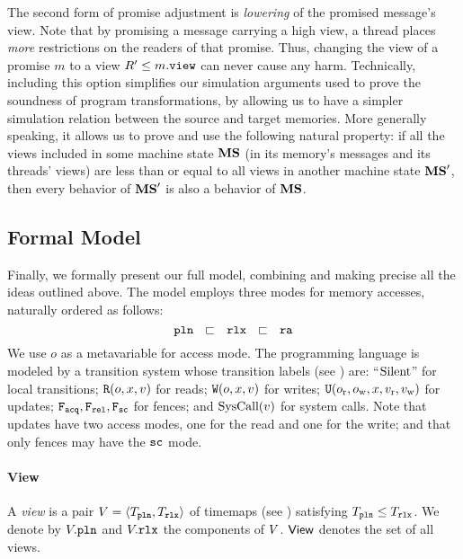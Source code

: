 The second form of promise adjustment is \emph{lowering} of the promised message's view.
Note that by promising a message carrying a high view, a thread places \emph{more} restrictions on the readers of that promise.
Thus, changing the view of a promise $m$ to a view $R'\leq m.\texttt{view}$ can never cause any harm.
Technically, including this option simplifies our simulation arguments used to prove the soundness of program transformations,
by allowing us to have a simpler simulation relation between the source and target memories.
More generally speaking, it allows us to prove and use the following natural property:
if all the views included in some machine state ${\mathbf{MS}}$ (in its memory's messages and its threads' views)
are less than or equal to all views in another machine state ${\mathbf{MS}}'$, 
then every behavior of ${\mathbf{MS}}'$ is also a behavior of ${\mathbf{MS}}$.

\subsection{Formal Model}
\label{sec:full-formal}

Finally, we formally present our full model,
combining and making precise all the ideas outlined above.
The model employs three modes for memory accesses, naturally ordered as follows:
\[\texttt{pln} ~~\sqsubset~~\texttt{rlx}~~\sqsubset~~\texttt{ra}\]
We use $o$ as a metavariable for access mode.
The programming language is modeled by a transition system whose 
transition labels (see ) are:
``${\text{Silent}}$'' for local transitions;
${\texttt{R}(o,x,v)}$  for reads;
${\texttt{W}(o,x,v)}$  for writes;
${\texttt{U}(o_{\text{r}},o_{\text{w}},x,v_{\text{r}},v_{\text{w}})}$  for updates;
${\texttt{F}_{\texttt{acq}}},{\texttt{F}_{\texttt{rel}}},{\texttt{F}_{\texttt{sc}}}$ for fences;
and  ${{\text{SysCall}(v)}}$ for system calls.
Note that updates have two access modes, one for the read and one for the write;
and that only fences may have the ${\texttt{sc}}$ mode.

\paragraph{View}
A \emph{view} is a pair $V={\langle{T_{\texttt{pln}},T_{\texttt{rlx}}}\rangle}$ of timemaps (see )
satisfying $T_{\texttt{pln}} \leq T_{\texttt{rlx}}$.
We denote by $V.{\texttt{pln}}$ and $V.{\texttt{rlx}}$ the components of $V$.
${\mathsf{View}}$ denotes the set of all views.

